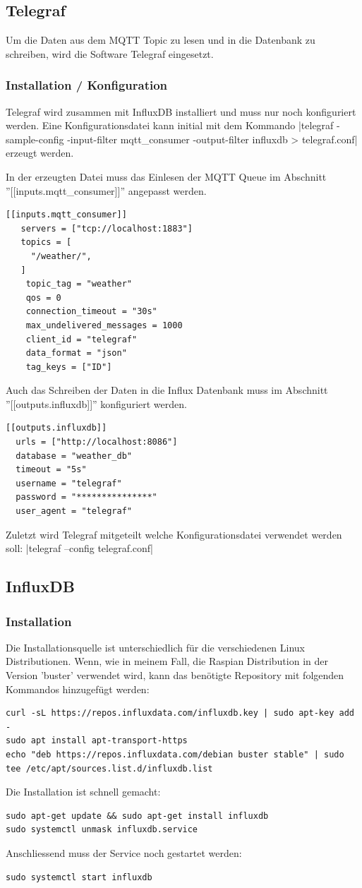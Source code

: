 \documentclass[
  12pt, %
  a4paper, %
  oneside, %
  openany, 
  numbers=noenddot, %
  BCOR=5mm, %
  parskip=half*, %
  thesis, %
]{bfhbook}
\begin{document}
   \subsection{Telegraf}
Um die Daten aus dem MQTT Topic zu lesen und in die Datenbank zu schreiben, wird die Software Telegraf \cite{telegraf} eingesetzt.
\subsubsection{Installation / Konfiguration}
Telegraf wird zusammen mit InfluxDB installiert und muss nur noch konfiguriert werden. Eine Konfigurationsdatei kann initial mit dem Kommando |telegraf -sample-config -input-filter mqtt_consumer -output-filter influxdb > telegraf.conf| erzeugt werden.

In der erzeugten Datei muss das Einlesen der MQTT Queue im Abschnitt ''[[inputs.mqtt{\_}consumer]]'' angepasst werden.
\begin{verbatim}
[[inputs.mqtt_consumer]]
   servers = ["tcp://localhost:1883"]
   topics = [
     "/weather/",
   ]
    topic_tag = "weather"
    qos = 0
    connection_timeout = "30s"
    max_undelivered_messages = 1000
    client_id = "telegraf"
    data_format = "json"
    tag_keys = ["ID"]
\end{verbatim}
Auch das Schreiben der Daten in die Influx Datenbank muss im Abschnitt ''[[outputs.influxdb]]'' konfiguriert werden.
\begin{verbatim}
[[outputs.influxdb]]
  urls = ["http://localhost:8086"]
  database = "weather_db"
  timeout = "5s"
  username = "telegraf"
  password = "***************"
  user_agent = "telegraf"
\end{verbatim}

Zuletzt wird Telegraf mitgeteilt welche Konfigurationsdatei verwendet werden soll: |telegraf --config telegraf.conf|
\subsection{InfluxDB}
   \subsubsection{Installation}
   Die Installationsquelle ist unterschiedlich für die verschiedenen Linux Distributionen. Wenn, wie in meinem Fall, die Raspian Distribution in der Version 'buster' verwendet wird, kann das benötigte Repository mit folgenden Kommandos hinzugefügt werden:
 \begin{verbatim}
curl -sL https://repos.influxdata.com/influxdb.key | sudo apt-key add -
sudo apt install apt-transport-https
echo "deb https://repos.influxdata.com/debian buster stable" | sudo tee /etc/apt/sources.list.d/influxdb.list
\end{verbatim}
Die Installation ist schnell gemacht:
 \begin{verbatim}
sudo apt-get update && sudo apt-get install influxdb
sudo systemctl unmask influxdb.service
   \end{verbatim}
   Anschliessend muss der Service noch gestartet werden:
    \begin{verbatim}
sudo systemctl start influxdb
   \end{verbatim}
\end{document}
